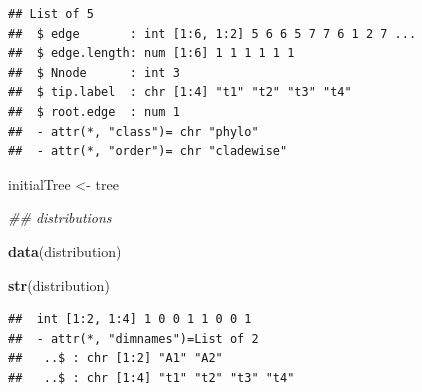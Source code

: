 \documentclass[]{article}
\newenvironment{Shaded}{\begin{snugshade}}{\end{snugshade}}
\newcommand{\CommentTok}[1]{\textcolor[rgb]{0.56,0.35,0.01}{\textit{#1}}}
\newcommand{\KeywordTok}[1]{\textcolor[rgb]{0.13,0.29,0.53}{\textbf{#1}}}
\newcommand{\NormalTok}[1]{#1}
\newcommand{\StringTok}[1]{\textcolor[rgb]{0.31,0.60,0.02}{#1}}
\begin{document}
\begin{verbatim}
## List of 5
##  $ edge       : int [1:6, 1:2] 5 6 6 5 7 7 6 1 2 7 ...
##  $ edge.length: num [1:6] 1 1 1 1 1 1
##  $ Nnode      : int 3
##  $ tip.label  : chr [1:4] "t1" "t2" "t3" "t4"
##  $ root.edge  : num 1
##  - attr(*, "class")= chr "phylo"
##  - attr(*, "order")= chr "cladewise"
\end{verbatim}

\begin{Shaded}
\begin{Highlighting}[]
\NormalTok{initialTree <-}\StringTok{ }\NormalTok{tree}


\CommentTok{## distributions}

\KeywordTok{data}\NormalTok{(distribution)}

\KeywordTok{str}\NormalTok{(distribution)}
\end{Highlighting}
\end{Shaded}

\begin{verbatim}
##  int [1:2, 1:4] 1 0 0 1 1 0 0 1
##  - attr(*, "dimnames")=List of 2
##   ..$ : chr [1:2] "A1" "A2"
##   ..$ : chr [1:4] "t1" "t2" "t3" "t4"
\end{verbatim}
\end{document}
